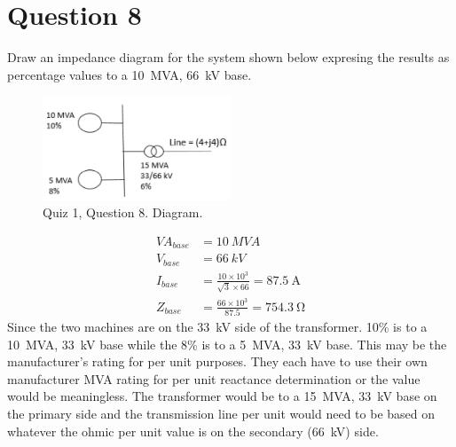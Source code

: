 \section{Question 8}
Draw an impedance diagram for the system shown below expresing the results as percentage values to a \SI{10}{MVA}, \SI{66}{kV} base.
\begin{figure}[H]
    \centering
    \includegraphics[width = 0.5\textwidth]{img/figure148.png}
    \caption{Quiz 1, Question 8. Diagram.}
\end{figure}
\begin{align}
    VA_{base} &= \SI{10}{MVA}\\
    V_{base} &= \SI{66}{kV}\\
    I_{base} &= \frac{10\times10^3}{\sqrt{3}\times 66} = \SI{87.5}{\ampere}\\
    Z_{base} &= \frac{66\times 10^3}{87.5} = \SI{754.3}{\ohm}
\end{align}
Since the two machines are on the \SI{33}{kV} side of the transformer. 10\% is to a \SI{10}{MVA}, \SI{33}{kV} base while the 8\% is to a \SI{5}{MVA}, \SI{33}{kV} base. This may be the manufacturer's rating for per unit purposes. They each have to use their own manufacturer MVA rating for per unit reactance determination or the value would be meaningless. The transformer would be to a \SI{15}{MVA}, \SI{33}{kV} base on the primary side and the transmission line per unit would need to be based on whatever the ohmic per unit value is on the secondary (\SI{66}{kV}) side.

